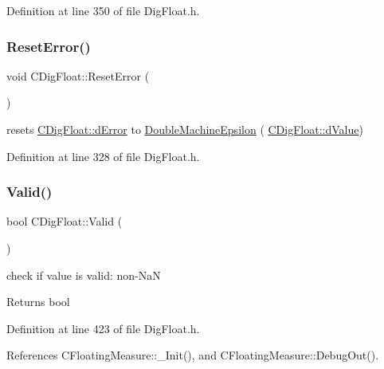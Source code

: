 Definition at line 350 of file Dig\+Float.\+h.

\mbox{\label{classCDigFloat_a47dd744a2100dc850ede1511e616ed39}} 
\subsubsection{\texorpdfstring{Reset\+Error()}{ResetError()}}
{\footnotesize\ttfamily void C\+Dig\+Float\+::\+Reset\+Error (\begin{DoxyParamCaption}{ }\end{DoxyParamCaption})\hspace{0.3cm}{\ttfamily [inline]}}



resets \hyperlink{classCDigFloat_a25eb3782d1e727ff007a48f8308e3d4d}{C\+Dig\+Float\+::d\+Error} to \hyperlink{Utils_8h_ae9dfc174daaf6261f167ccc069efea93}{Double\+Machine\+Epsilon} ( \hyperlink{classCDigFloat_a4bbe69e30dd4e20527362493aa9aaf96}{C\+Dig\+Float\+::d\+Value}) 



Definition at line 328 of file Dig\+Float.\+h.

\mbox{\label{classCDigFloat_aab339f7e1ffa5c88f3dbb432389752c9}} 
\subsubsection{\texorpdfstring{Valid()}{Valid()}}
{\footnotesize\ttfamily bool C\+Dig\+Float\+::\+Valid (\begin{DoxyParamCaption}{ }\end{DoxyParamCaption})\hspace{0.3cm}{\ttfamily [inline]}}



check if value is valid\+: non-\/\+NaN 

\begin{DoxyReturn}{Returns}
bool 
\end{DoxyReturn}


Definition at line 423 of file Dig\+Float.\+h.



References C\+Floating\+Measure\+::\+\_\+\+Init(), and C\+Floating\+Measure\+::\+Debug\+Out().

